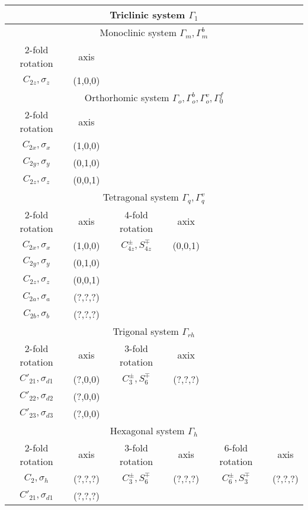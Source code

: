 \documentclass[11pt,a4paper]{report}
\begin{document}
\begin{center}
\begin{tabular}{||c|c|||c|c||c|c||}
\hline
\multicolumn{6}{|c|}{Triclinic system $\Gamma_1$}\\
\hline
\hline
\multicolumn{6}{|c|}{Monoclinic system $\Gamma_m, \Gamma_m^b$}\\
\hline
2-fold rotation & axis &  & &  &\\
\hline
$C_{2z},\sigma_z$ & (1,0,0)  &  &  &   &\\  
\hline
\hline
\multicolumn{6}{|c|}{Orthorhomic system 
$\Gamma_o,\Gamma_o^b,\Gamma_o^v,\Gamma_0^f$}\\
%
\hline
2-fold rotation & axis &  & &  &\\
\hline
$C_{2x},\sigma_x$ & (1,0,0)  &  &  &   &\\  
$C_{2y},\sigma_y$ & (0,1,0)  &  &  &   &\\  
$C_{2z},\sigma_z$ & (0,0,1)  &  &  &   &\\  
\hline
\hline
\multicolumn{6}{|c|}{Tetragonal system $\Gamma_q,\Gamma_q^v$}\\
\hline
2-fold rotation & axis & 4-fold rotation &axix &  & \\
\hline
$C_{2x},\sigma_x$ & (1,0,0) &  $C^\pm_{4z},S^\mp_{4z}$ & (0,0,1) & & \\
$C_{2y},\sigma_y$ & (0,1,0) &  & & & \\
$C_{2z},\sigma_z$ & (0,0,1) &  & & & \\
$C_{2a},\sigma_a$ & (?,?,?) &  & & & \\
$C_{2b},\sigma_b$ & (?,?,?) &  & & & \\
\hline
%
\hline
\multicolumn{6}{|c|}{Trigonal system $\Gamma_{rh}$}\\
\hline
2-fold rotation & axis & 3-fold rotation &axix &  & \\
\hline
$C'_{21},\sigma_{d1}$ & (?,0,0)  & $C^\pm_3,S^\mp_6$ & (?,?,?) &   &\\  
$C'_{22},\sigma_{d2}$ & (?,0,0)  & &  &   &\\  
$C'_{23},\sigma_{d3}$ & (?,0,0)  & &  &   &\\  
\hline
%
\hline
\multicolumn{6}{|c|}{Hexagonal system $\Gamma_h$}\\
\hline
2-fold rotation & axis & 3-fold rotation &axis &6-fold rotation  & axis\\
\hline
$C_{2},\sigma_h$ & (?,?,?)  & $C^\pm_3,S^{\mp}_6$ & (?,?,?)  & $C^{\pm}_6,S^{\mp}_3$  & (?,?,?)\\  
$C'_{21},\sigma_{d1}$ & (?,?,?)  &  &  &   &\\  

\end{tabular}
\end{center}
\end{document}
